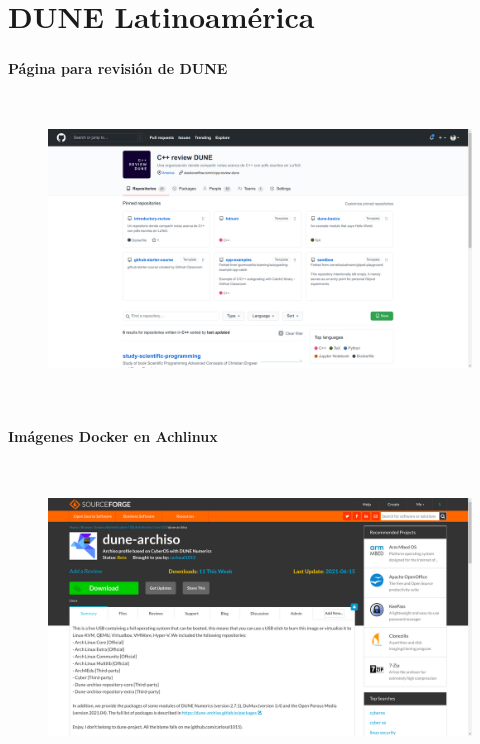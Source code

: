 {
\begin{frame}[plain]
\end{frame}
}
\section{DUNE Latinoamérica}
\begin{frame}
	\frametitle{\secname}
	\framesubtitle{Página para revisión de DUNE}
	\begin{figure}[ht!]
		\centering
		\includegraphics[height=8cm, width=12cm]{cpp_review}
	\end{figure}
\end{frame}

\begin{frame}
	\frametitle{\secname}
	\framesubtitle{Imágenes Docker en Achlinux}
	\begin{figure}[ht!]
		\centering
		\includegraphics[height=8cm, width=12cm]{archiso}
	\end{figure}
\end{frame}

